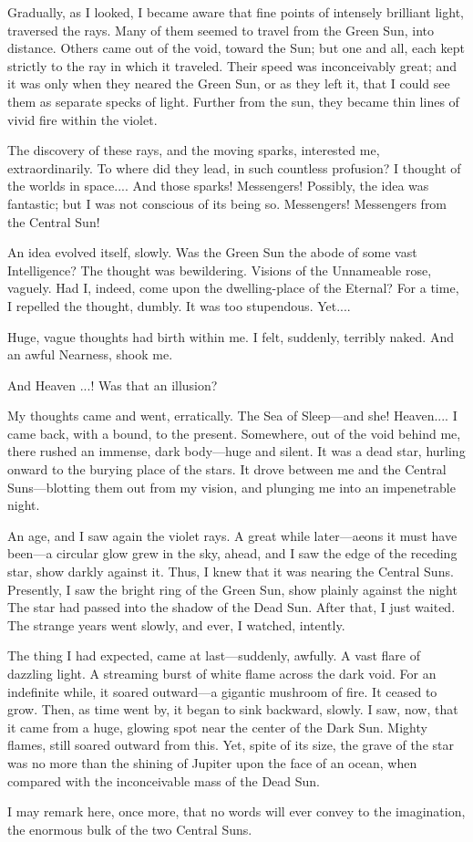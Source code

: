 Gradually, as I looked, I became aware that fine points of intensely brilliant light, traversed the rays. Many of them seemed to travel from the Green Sun, into distance. Others came out of the void, toward the Sun; but one and all, each kept strictly to the ray in which it traveled. Their speed was inconceivably great; and it was only when they neared the Green Sun, or as they left it, that I could see them as separate specks of light. Further from the sun, they became thin lines of vivid fire within the violet.

The discovery of these rays, and the moving sparks, interested me, extraordinarily. To where did they lead, in such countless profusion? I thought of the worlds in space.... And those sparks! Messengers! Possibly, the idea was fantastic; but I was not conscious of its being so. Messengers! Messengers from the Central Sun!

An idea evolved itself, slowly. Was the Green Sun the abode of some vast Intelligence? The thought was bewildering. Visions of the Unnameable rose, vaguely. Had I, indeed, come upon the dwelling-place of the Eternal? For a time, I repelled the thought, dumbly. It was too stupendous. Yet....

Huge, vague thoughts had birth within me. I felt, suddenly, terribly naked. And an awful Nearness, shook me.

And Heaven ...! Was that an illusion?

My thoughts came and went, erratically. The Sea of Sleep---and she! Heaven.... I came back, with a bound, to the present. Somewhere, out of the void behind me, there rushed an immense, dark body---huge and silent. It was a dead star, hurling onward to the burying place of the stars. It drove between me and the Central Suns---blotting them out from my vision, and plunging me into an impenetrable night.

An age, and I saw again the violet rays. A great while later---aeons it must have been---a circular glow grew in the sky, ahead, and I saw the edge of the receding star, show darkly against it. Thus, I knew that it was nearing the Central Suns. Presently, I saw the bright ring of the Green Sun, show plainly against the night The star had passed into the shadow of the Dead Sun. After that, I just waited. The strange years went slowly, and ever, I watched, intently.

The thing I had expected, came at last---suddenly, awfully. A vast flare of dazzling light. A streaming burst of white flame across the dark void. For an indefinite while, it soared outward---a gigantic mushroom of fire. It ceased to grow. Then, as time went by, it began to sink backward, slowly. I saw, now, that it came from a huge, glowing spot near the center of the Dark Sun. Mighty flames, still soared outward from this. Yet, spite of its size, the grave of the star was no more than the shining of Jupiter upon the face of an ocean, when compared with the inconceivable mass of the Dead Sun.

I may remark here, once more, that no words will ever convey to the imagination, the enormous bulk of the two Central Suns.

\clearpage

